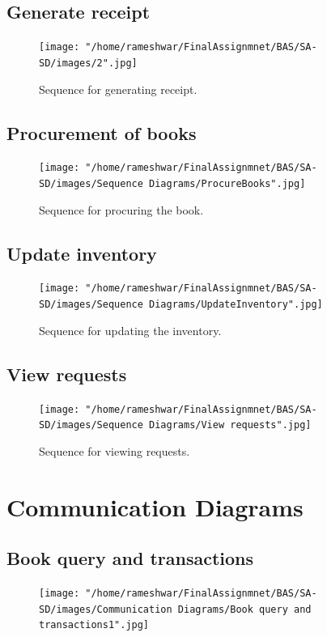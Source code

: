 \documentclass{scrreprt}
\begin{document}
\subsection{Generate receipt}
\begin{figure}[!htb]
  \texttt{[image: "/home/rameshwar/FinalAssignmnet/BAS/SA-SD/images/2".jpg]}
  \caption{Sequence for generating receipt.}
  \label{fig:seqdiagram}
\end{figure}


\subsection{Procurement of books}
\begin{figure}[!htb]
  \texttt{[image: "/home/rameshwar/FinalAssignmnet/BAS/SA-SD/images/Sequence Diagrams/ProcureBooks".jpg]}
  \caption{Sequence for procuring the book.}
  \label{fig:seqdiagram}
\end{figure}

\clearpage

\subsection{Update inventory}
\begin{figure}[!htb]
  \texttt{[image: "/home/rameshwar/FinalAssignmnet/BAS/SA-SD/images/Sequence Diagrams/UpdateInventory".jpg]}
  \caption{Sequence for updating the inventory.}
  \label{fig:seqdiagram}
\end{figure}

\subsection{View requests}
\begin{figure}[!htb]
  \texttt{[image: "/home/rameshwar/FinalAssignmnet/BAS/SA-SD/images/Sequence Diagrams/View requests".jpg]}
  \caption{Sequence for viewing requests.}
  \label{fig:seqdiagram}
\end{figure}

\clearpage
\section{Communication Diagrams}
\subsection{Book query and transactions}
\begin{figure}[!htb]
  \texttt{[image: "/home/rameshwar/FinalAssignmnet/BAS/SA-SD/images/Communication Diagrams/Book query and transactions1".jpg]}
   \label{fig:seqdiagram}
\end{figure}
\end{document}
